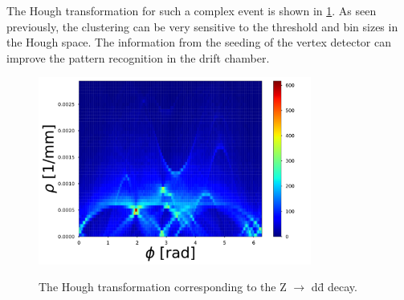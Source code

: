 The Hough transformation for such a complex event is shown in \cref{HTZdd}. As seen previously, the clustering can be very sensitive to the threshold and bin sizes in the Hough space. The information from the seeding of the vertex detector can improve the pattern recognition in the drift chamber.

\begin{figure}[ht]
	\centering
  \includegraphics[width=0.8\textwidth]{figures/HT_Zdd.pdf}
	\label{HTZdd}
	\caption{The Hough transformation corresponding to the Z $\rightarrow$ d\={d} decay.}
\end{figure}
